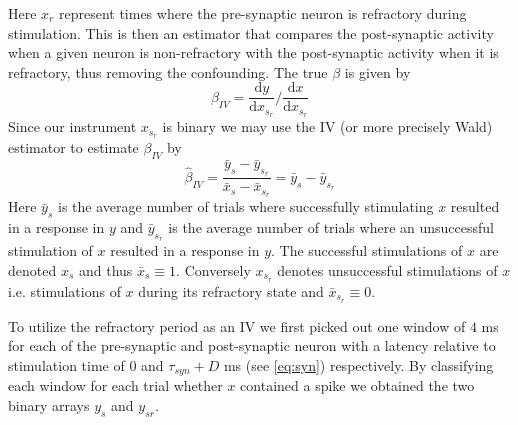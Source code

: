 \documentclass[11pt]{article}
\newcommand{\de}[2]{\frac{\mathrm{d} #1}{\mathrm{d} #2}}
\begin{document}
\begin{center}
\end{center}
Here $ x_r $ represent times where the pre-synaptic neuron is refractory during stimulation. This is then an estimator that compares the post-synaptic activity when a given neuron is non-refractory with the post-synaptic activity when it is refractory, thus removing the confounding. The true $ \beta $ is given by
\begin{equation}
\beta_{IV} = \de{y}{x_{s_r}} / \de{x}{x_{s_r}}
\end{equation}
Since our instrument $ x_{s_r} $ is binary we may use the IV (or more precisely Wald) estimator \citep{wald1940fitting} to estimate $ \beta_{IV} $ by
\begin{equation}
 \hat{\beta}_{IV} = \frac{\bar{y}_{s} - \bar{y}_{s_r}}{\bar{x}_{s} - \bar{x}_{s_r}} = \bar{y}_{s} - \bar{y}_{s_r}
 \label{eq:wald}
\end{equation}
Here $ \bar{y}_s $ is the average number of trials where successfully stimulating $ x $ resulted in a response in $ y $ and $ \bar{y}_{s_r} $ is the average number of trials where an unsuccessful stimulation of $x$ resulted in a response in $ y $. The successful stimulations of $x$ are denoted $x_s$ and thus  $\bar{x}_s \equiv 1$. Conversely $x_{s_r}$ denotes unsuccessful stimulations of $x$ i.e. stimulations of $x$ during its refractory state and $\bar{x}_{s_r} \equiv 0$.

To utilize the refractory period as an IV we first picked out one window of $ 4 $ ms for each of the pre-synaptic and post-synaptic neuron with a latency relative to stimulation time of $ 0 $ and $ \tau_{syn} + D $ ms (see \cref{eq:syn}) respectively. By classifying each window for each trial whether $x$ contained a spike we obtained the two binary arrays $ y_s $ and $ y_{sr} $.
\end{document}
